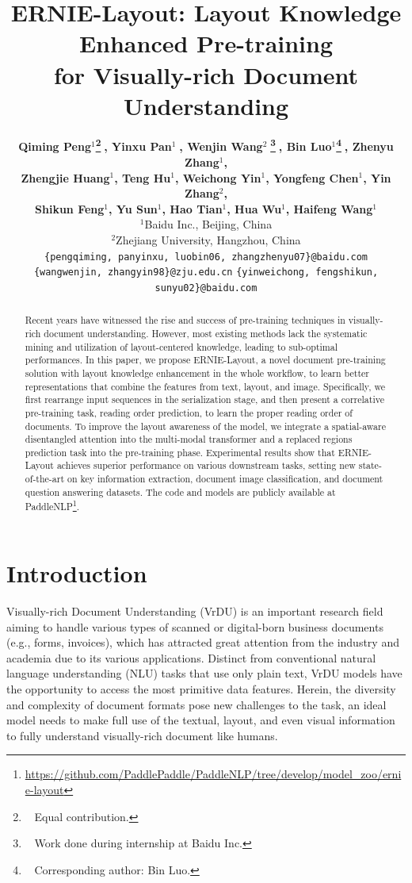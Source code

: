 \documentclass[11pt]{article}
\title{ERNIE-Layout: Layout Knowledge Enhanced Pre-training  \\ for Visually-rich Document Understanding}
\author{
\textbf{Qiming Peng$^{1}$\thanks{~ Equal contribution.}$\;$, Yinxu Pan$^{1}$\footnotemark[1]$\;$, Wenjin Wang$^{2}$\footnotemark[1]$\;$\thanks{~ Work done during internship at Baidu Inc.}$\;$, Bin Luo$^{1}$\thanks{~ Corresponding author: Bin Luo.}$\;$, Zhenyu Zhang$^{1}$,} \\ 
\textbf{Zhengjie Huang$^{1}$, Teng Hu$^{1}$, Weichong Yin$^{1}$, Yongfeng Chen$^{1}$, Yin Zhang$^{2}$,} \\ 
\textbf{Shikun Feng$^{1}$, Yu Sun$^{1}$, Hao Tian$^{1}$, Hua Wu$^{1}$, Haifeng Wang$^{1}$} \\
$^{1}$Baidu Inc., Beijing, China \\
$^{2}$Zhejiang University, Hangzhou, China \\
{\small \texttt{\{pengqiming, panyinxu, luobin06, zhangzhenyu07\}@baidu.com}} \\
{\small \texttt{\{wangwenjin, zhangyin98\}@zju.edu.cn} \quad \texttt{\{yinweichong, fengshikun, sunyu02\}@baidu.com}}
}
\begin{document}
\maketitle
\begin{abstract}

Recent years have witnessed the rise and success of pre-training techniques in visually-rich document understanding.
However, most existing methods lack the systematic mining and utilization of layout-centered knowledge, leading to sub-optimal performances.
In this paper, we propose ERNIE-Layout, a novel document pre-training solution with layout knowledge enhancement in the whole workflow, to learn better representations that combine the features from text, layout, and image.
Specifically, we first rearrange input sequences in the serialization stage, and then present a correlative pre-training task, reading order prediction, to learn the proper reading order of documents.
To improve the layout awareness of the model, we integrate a spatial-aware disentangled attention into the multi-modal transformer and a replaced regions prediction task into the pre-training phase. 
Experimental results show that ERNIE-Layout achieves superior performance on various downstream tasks, setting new state-of-the-art on key information extraction, document image classification, and document question answering datasets. 
The code and models are publicly available at PaddleNLP\footnote{\url{https://github.com/PaddlePaddle/PaddleNLP/tree/develop/model_zoo/ernie-layout}}.

\end{abstract}


\section{Introduction}
Visually-rich Document Understanding (VrDU) is an important research field aiming to handle various types of scanned or digital-born business documents (e.g., forms, invoices), which has attracted great attention from the industry and academia due to its various applications.
Distinct from conventional natural language understanding (NLU) tasks that use only plain text, VrDU models have the opportunity to access the most primitive data features.
Herein, the diversity and complexity of document formats pose new challenges to the task, an ideal model needs to make full use of the textual, layout, and even visual information to fully understand visually-rich document like humans.
\end{document}
